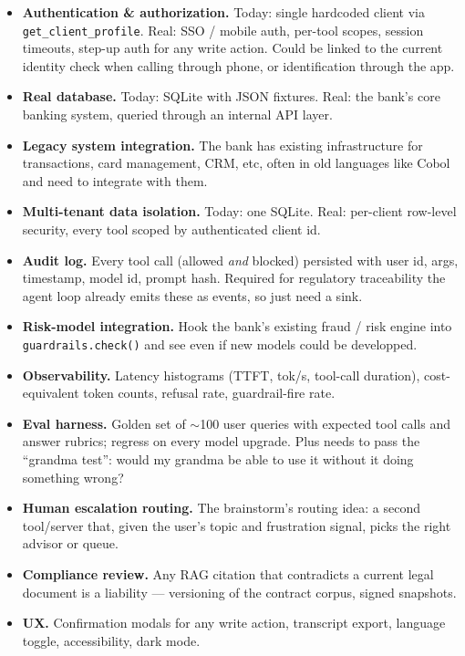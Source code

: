 \documentclass[11pt]{article}
\begin{document}
\begin{itemize}[leftmargin=*]
  \item \textbf{Authentication \& authorization.} Today: single hardcoded client via \texttt{get\_client\_profile}. Real: SSO / mobile auth, per-tool scopes, session timeouts, step-up auth for any write action. Could be linked to the current identity check when calling through phone, or identification through the app.
  \item \textbf{Real database.} Today: SQLite with JSON fixtures. Real: the bank's core banking system, queried through an internal API layer.
  \item \textbf{Legacy system integration.} The bank has existing infrastructure for transactions, card management, CRM, etc, often in old languages like Cobol and need to integrate with them.
  \item \textbf{Multi-tenant data isolation.} Today: one SQLite. Real: per-client row-level security, every tool scoped by authenticated client id.
  \item \textbf{Audit log.} Every tool call (allowed \emph{and} blocked) persisted with user id, args, timestamp, model id, prompt hash. Required for regulatory traceability the agent loop already emits these as events, so just need a sink.
  \item \textbf{Risk-model integration.} Hook the bank's existing fraud / risk engine into \texttt{guardrails.check()} and see even if new models could be developped.
  \item \textbf{Observability.} Latency histograms (TTFT, tok/s, tool-call duration), cost-equivalent token counts, refusal rate, guardrail-fire rate.
  \item \textbf{Eval harness.} Golden set of $\sim$100 user queries with expected tool calls and answer rubrics; regress on every model upgrade. Plus needs to pass the ``grandma test'': would my grandma be able to use it without it doing something wrong?
  \item \textbf{Human escalation routing.} The brainstorm's routing idea: a second tool/server that, given the user's topic and frustration signal, picks the right advisor or queue.
  \item \textbf{Compliance review.} Any RAG citation that contradicts a current legal document is a liability --- versioning of the contract corpus, signed snapshots.
  \item \textbf{UX.} Confirmation modals for any write action, transcript export, language toggle, accessibility, dark mode.
\end{itemize}
\end{document}
